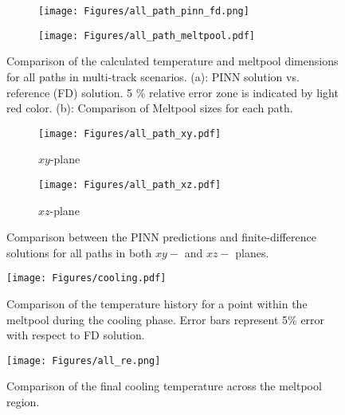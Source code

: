 \begin{figure}[p]
    \centering
    \begin{subfigure}{0.65\textwidth}
    \texttt{[image: Figures/all\_path\_pinn\_fd.png]}
    \caption{}
    \label{fig:all_path_a}
    \end{subfigure}
    \begin{subfigure}{0.85\textwidth}
    \texttt{[image: Figures/all\_path\_meltpool.pdf]}
    \caption{}
    \label{fig:all_path_b}
    \end{subfigure}
    
    \caption{Comparison of the calculated temperature and meltpool dimensions for all paths in multi-track scenarios. (a): PINN solution vs. reference (FD) solution. 5 \% relative error zone is indicated by light red color. (b): Comparison of Meltpool sizes for each path.}
    \label{fig:all_compare}
\end{figure}

\begin{figure}[p]
    \centering
    \begin{subfigure}{0.85\textwidth}
    \texttt{[image: Figures/all\_path\_xy.pdf]}
    \caption{$xy$-plane}
    \label{fig:multi_a}
    \end{subfigure}
    \begin{subfigure}{0.85\textwidth}
    \texttt{[image: Figures/all\_path\_xz.pdf]}
    \caption{$xz$-plane}
    \label{fig:multi_b}
    \end{subfigure}
    
    \caption{Comparison between the PINN predictions and finite-difference solutions for all paths in both $xy-$ and $xz-$ planes.}
    \label{fig:all_compare_T}
\end{figure}


\begin{figure}[p]
    \centering
    \texttt{[image: Figures/cooling.pdf]}
    \caption{Comparison of the temperature history for a point within the meltpool during the cooling phase. Error bars represent 5\% error with respect to FD solution.}
    \label{fig:cooling}
\end{figure}

\begin{figure}[p]
    \centering
    \texttt{[image: Figures/all\_re.png]}
    \caption{Comparison of the final cooling temperature across the meltpool region.}
    \label{fig:cooling_all}
\end{figure}